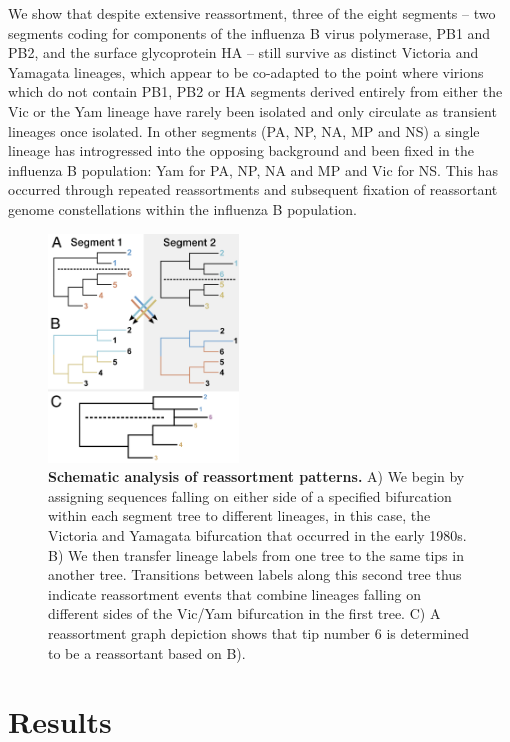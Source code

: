 \documentclass[11pt,oneside,letterpaper]{article}
\begin{document}
We show that despite extensive reassortment, three of the eight segments -- two segments coding for components of the influenza B virus polymerase, PB1 and PB2, and the surface glycoprotein HA -- still survive as distinct Victoria and Yamagata lineages, which appear to be co-adapted to the point where virions which do not contain PB1, PB2 or HA segments derived entirely from either the Vic or the Yam lineage have rarely been isolated and only circulate as transient lineages once isolated.
In other segments (PA, NP, NA, MP and NS) a single lineage has introgressed into the opposing background and been fixed in the influenza B population: Yam for PA, NP, NA and MP and Vic for NS.
This has occurred through repeated reassortments and subsequent fixation of reassortant genome constellations within the influenza B population.

\begin{figure}[h]
 \centering		
	\includegraphics[width=0.45\textwidth]{figures/TreeFigure2.png}
	\caption{\textbf{Schematic analysis of reassortment patterns.}
	A) We begin by assigning sequences falling on either side of a specified bifurcation within each segment tree to different lineages, in this case, the Victoria and Yamagata bifurcation that occurred in the early 1980s.
	B) We then transfer lineage labels from one tree to the same tips in another tree.
	Transitions between labels along this second tree thus indicate reassortment events that combine lineages falling on different sides of the Vic/Yam bifurcation in the first tree.
	C) A reassortment graph depiction shows that tip number 6 is determined to be a reassortant based on B).
	}
	\label{methodFig}
\end{figure}

\section*{Results}
\end{document}
